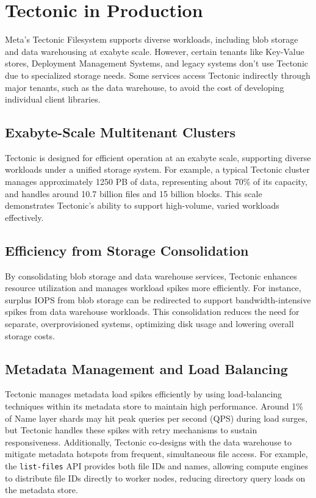\section{Tectonic in Production}

Meta's Tectonic Filesystem supports diverse workloads, including blob storage and data warehousing at exabyte scale. However, certain tenants like Key-Value stores, Deployment Management Systems, and legacy systems don’t use Tectonic due to specialized storage needs. Some services access Tectonic indirectly through major tenants, such as the data warehouse, to avoid the cost of developing individual client libraries. 

\subsection{Exabyte-Scale Multitenant Clusters}

Tectonic is designed for efficient operation at an exabyte scale, supporting diverse workloads under a unified storage system. For example, a typical Tectonic cluster manages approximately 1250 PB of data, representing about 70\% of its capacity, and handles around 10.7 billion files and 15 billion blocks. This scale demonstrates Tectonic's ability to support high-volume, varied workloads effectively.

\subsection{Efficiency from Storage Consolidation}

By consolidating blob storage and data warehouse services, Tectonic enhances resource utilization and manages workload spikes more efficiently. For instance, surplus IOPS from blob storage can be redirected to support bandwidth-intensive spikes from data warehouse workloads. This consolidation reduces the need for separate, overprovisioned systems, optimizing disk usage and lowering overall storage costs.

\subsection{Metadata Management and Load Balancing}

Tectonic manages metadata load spikes efficiently by using load-balancing techniques within its metadata store to maintain high performance. Around 1\% of Name layer shards may hit peak queries per second (QPS) during load surges, but Tectonic handles these spikes with retry mechanisms to sustain responsiveness. Additionally, Tectonic co-designs with the data warehouse to mitigate metadata hotspots from frequent, simultaneous file access. For example, the \texttt{list-files} API provides both file IDs and names, allowing compute engines to distribute file IDs directly to worker nodes, reducing directory query loads on the metadata store.

